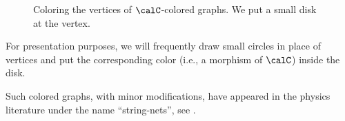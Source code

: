 \begin{figure} [ht]
\centering
  \caption{Coloring the vertices of $\calC$-colored graphs.
  We put a small disk at the vertex.}
  \label{f:graphical-morphism3}
\end{figure}

For presentation purposes, we will frequently draw small circles in place of
vertices and put the corresponding color (i.e., a morphism of $\calC$) inside
the disk.

Such colored graphs, with minor modifications, have appeared in the physics
literature under the name ``string-nets'', see \cite{levin-wen}.


